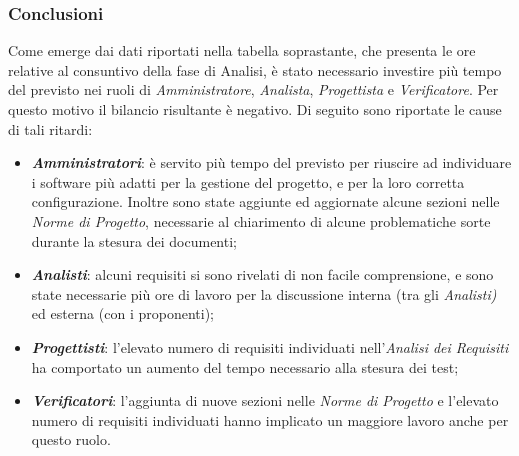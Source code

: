 \subsubsection{Conclusioni}
Come emerge dai dati riportati nella tabella soprastante, che presenta le ore relative al consuntivo della fase di Analisi, è stato necessario investire più tempo del previsto nei ruoli di \textit{Amministratore}, \textit{Analista}, \textit{Progettista} e \textit{Verificatore}. Per questo motivo il bilancio risultante è negativo. Di seguito sono riportate le cause di tali ritardi:
\begin{itemize}
	\item \textbf{\textit{Amministratori}}: è servito più tempo del previsto per riuscire ad individuare i software più adatti per la gestione del progetto, e per la loro corretta configurazione. Inoltre sono state aggiunte ed aggiornate alcune sezioni nelle \textit{Norme di Progetto}, necessarie al chiarimento di alcune problematiche sorte durante la stesura dei documenti;
	\item \textbf{\textit{Analisti}}: alcuni requisiti si sono rivelati di non facile comprensione, e sono state necessarie più ore di lavoro per la discussione interna (tra gli \textit{Analisti)} ed esterna (con i proponenti); 
	\item \textbf{\textit{Progettisti}}: l'elevato numero di requisiti individuati nell'\textit{Analisi dei Requisiti} ha comportato un aumento del tempo necessario alla stesura dei test;
	\item \textbf{\textit{Verificatori}}: l'aggiunta di nuove sezioni nelle \textit{Norme di Progetto} e l'elevato numero di requisiti individuati hanno implicato un maggiore lavoro anche per questo ruolo. 
\end{itemize}